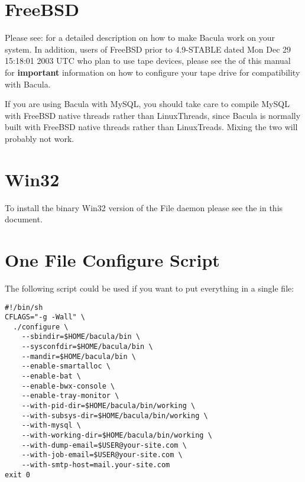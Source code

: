 \section{FreeBSD}

Please see: 
 for a
detailed description on how to make Bacula work on your system. In addition,
users of FreeBSD prior to 4.9-STABLE dated Mon Dec 29 15:18:01 2003 UTC who
plan to use tape devices, please see the 
 of this manual for
{\bf important} information on how to configure your tape drive for
compatibility with Bacula. 

If you are using Bacula with MySQL, you should take care to compile MySQL with
FreeBSD native threads rather than LinuxThreads, since Bacula is normally built
with FreeBSD native threads rather than LinuxTreads. Mixing the two will
probably not work. 

\section{Win32}

To install the binary Win32 version of the File daemon please see the 
 in this document. 

\section{One File Configure Script}

The following script could be used if you want to put everything
in a single file:

\footnotesize
\begin{verbatim}
#!/bin/sh
CFLAGS="-g -Wall" \
  ./configure \
    --sbindir=$HOME/bacula/bin \
    --sysconfdir=$HOME/bacula/bin \
    --mandir=$HOME/bacula/bin \
    --enable-smartalloc \
    --enable-bat \
    --enable-bwx-console \
    --enable-tray-monitor \
    --with-pid-dir=$HOME/bacula/bin/working \
    --with-subsys-dir=$HOME/bacula/bin/working \
    --with-mysql \
    --with-working-dir=$HOME/bacula/bin/working \
    --with-dump-email=$USER@your-site.com \
    --with-job-email=$USER@your-site.com \
    --with-smtp-host=mail.your-site.com
exit 0
\end{verbatim}
\normalsize

